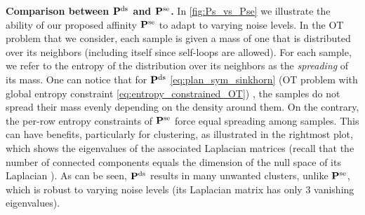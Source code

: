 \textbf{Comparison between $\mathbf{P}^{\mathrm{ds}}$ and $\mathbf{P}^{\mathrm{se}}$.} In \cref{fig:Ps_vs_Pse} we illustrate the ability of our proposed affinity $\mathbf{P}^{\mathrm{se}}$ to adapt to varying noise levels. In the OT problem that we consider, each sample is given a mass of one that is distributed over its neighbors (including itself since self-loops are allowed). For each sample, we refer to the entropy of the distribution over its neighbors as the \emph{spreading} of its mass. One can notice that for $\mathbf{P}^{\mathrm{ds}}$ \eqref{eq:plan_sym_sinkhorn} 
(OT problem with global entropy constraint \eqref{eq:entropy_constrained_OT})
, the samples do not spread their mass evenly depending on the density around them. On the contrary, the per-row entropy constraints of $\mathbf{P}^{\mathrm{se}}$ force equal spreading among samples.
This can have benefits, particularly for clustering, as illustrated in the rightmost plot, which shows the eigenvalues of the associated Laplacian matrices (recall that the number of connected components equals the dimension of the null space of its Laplacian \cite{chung1997spectral}). As can be seen, $\mathbf{P}^{\mathrm{ds}}$ results in many unwanted clusters, unlike $\mathbf{P}^{\mathrm{se}}$, which is robust to varying noise levels (its Laplacian matrix has only $3$ vanishing eigenvalues). 
